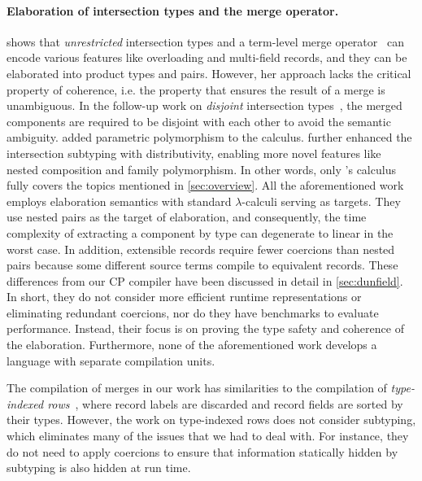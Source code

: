 \paragraph{Elaboration of intersection types and the merge operator.}
\citet{dunfield2014elaborating} shows that \emph{unrestricted} intersection
types and a term-level merge operator~\citep{reynolds1997design} can encode
various features like overloading and multi-field records, and they can be
elaborated into product types and pairs. However, her approach lacks the
critical property of coherence, i.e. the property that ensures the result of a
merge is unambiguous. In the follow-up work on \emph{disjoint} intersection
types~\citep{oliveira2016disjoint}, the merged components are required to be
disjoint with each other to avoid the semantic ambiguity.
\citet{alpuim2017disjoint} added parametric polymorphism to the calculus.
\citet{bi2018essence,bi2019distributive} further enhanced the intersection
subtyping with distributivity, enabling more novel features like nested
composition and family polymorphism. In other words, only
\citeauthor{bi2019distributive}'s \fiplus calculus fully covers the topics
mentioned in \autoref{sec:overview}. All the aforementioned work employs
elaboration semantics with standard $\lambda$-calculi serving as targets. They
use nested pairs as the target of elaboration, and consequently, the time
complexity of extracting a component by type can degenerate to linear in the
worst case. In addition, extensible records require fewer coercions than nested
pairs because some different source terms compile to equivalent records. These
differences from our CP compiler have been discussed in detail in
\autoref{sec:dunfield}. In short, they do not consider more efficient runtime
representations or eliminating redundant coercions, nor do they have benchmarks
to evaluate performance. Instead, their focus is on proving the type safety and
coherence of the elaboration. Furthermore, none of the aforementioned work
develops a language with separate compilation units.

The compilation of merges in our work has similarities to the compilation of
\emph{type-indexed rows}~\citep{shields2001type}, where record labels are
discarded and record fields are sorted by their types. However, the work on
type-indexed rows does not consider subtyping, which eliminates many of the
issues that we had to deal with. For instance, they do not need to apply
coercions to ensure that information statically hidden by subtyping is also
hidden at run time.

